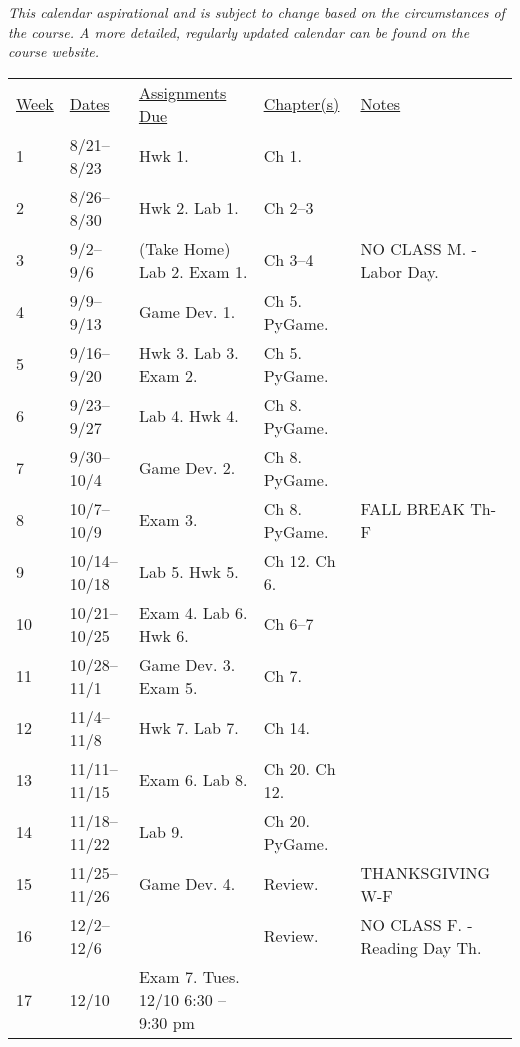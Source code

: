 \documentclass[10pt]{article}
\begin{document}
\textit{This calendar aspirational and is subject to change based on the circumstances of the course. A more detailed, regularly updated calendar can be found on the course website. }

\begin{center}
\begin{tabular}{lllll}
\underline{Week} & \underline{Dates} & \underline{Assignments Due} & \underline{Chapter(s)} & \underline{Notes} \\
1 & 8/21--8/23  & Hwk 1. & Ch 1. &  \\
2 & 8/26--8/30 &  Hwk 2. Lab 1. & Ch 2--3 & \\
3 & 9/2--9/6 & (Take Home) Lab 2. Exam 1. & Ch 3--4 & NO CLASS M. - Labor Day. \\
4 & 9/9--9/13  & Game Dev. 1.  &  Ch 5. PyGame. &  \\
5 & 9/16--9/20 & Hwk 3. Lab 3. Exam 2. & Ch 5. PyGame. & \\
6 & 9/23--9/27 & Lab 4. Hwk 4. & Ch 8. PyGame. & \\
7 & 9/30--10/4 & Game Dev. 2. & Ch 8. PyGame.  & \\
8 & 10/7--10/9 & Exam 3. & Ch 8. PyGame. & FALL BREAK Th-F  \\
9 & 10/14--10/18 & Lab 5. Hwk 5. & Ch 12. Ch 6. & \\
10 & 10/21--10/25  & Exam 4. Lab 6. Hwk 6. & Ch 6--7 & \\
11 & 10/28--11/1 & Game Dev. 3. Exam 5. & Ch 7. & \\
12 & 11/4--11/8 & Hwk 7. Lab 7. & Ch 14.  & \\
13 & 11/11--11/15 & Exam 6. Lab 8.  &  Ch 20. Ch 12. & \\
14 & 11/18--11/22 & Lab 9.  & Ch 20. PyGame. & \\
15 & 11/25--11/26 & Game Dev. 4. & Review. & THANKSGIVING W-F \\
16 & 12/2--12/6 & & Review.  & NO CLASS F. - Reading Day Th.\\
17 & 12/10 & Exam 7. Tues. 12/10 6:30 -- 9:30 pm & &  \\
\end{tabular}
\end{center}
\end{document}
